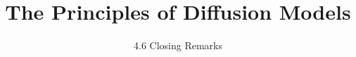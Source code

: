 ﻿%

\graphicspath{{../images/}}
\title{The Principles of Diffusion Models}
\subtitle{4.6 Closing Remarks}


\begin{frame}
    \titlepage
\end{frame}


